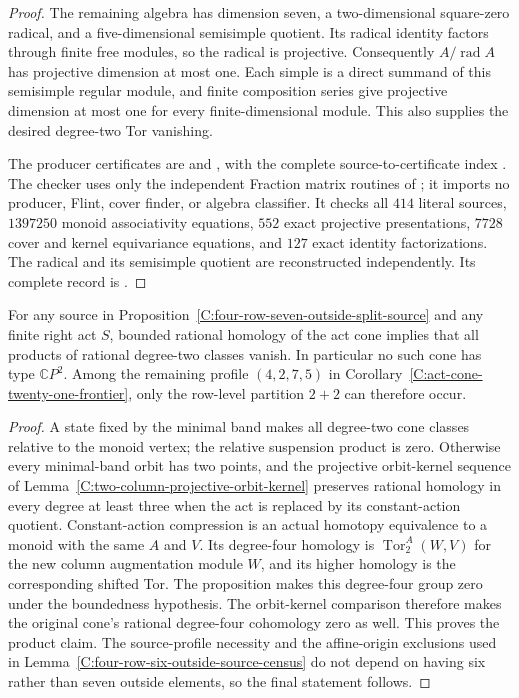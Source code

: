 \begin{proof}
The remaining algebra has dimension seven, a two-dimensional
square-zero radical, and a five-dimensional semisimple quotient.
Its radical identity factors through finite free modules, so the
radical is projective.  Consequently $A/\operatorname{rad}A$ has
projective dimension at most one.  Each simple is a direct summand
of this semisimple regular module, and finite composition series
give projective dimension at most one for every finite-dimensional
module.  This also supplies the desired degree-two Tor vanishing.

The producer certificates are
 and
, with the complete
source-to-certificate index
.
The checker  uses
only the independent Fraction matrix routines of
; it imports no
producer, Flint, cover finder, or algebra classifier.
It checks all $414$ literal sources, $1397250$ monoid associativity
equations, $552$ exact projective presentations, $7728$ cover and
kernel equivariance equations, and $127$ exact identity
factorizations.  The radical and its semisimple quotient are
reconstructed independently.  Its complete record is
.
\end{proof}

\begin{corollary}
\label{C:four-row-seven-outside-split-act-cones}
For any source in Proposition~\ref{C:four-row-seven-outside-split-source}
and any finite right act $S$, bounded rational homology of the act
cone implies that all products of rational degree-two classes vanish.
In particular no such cone has type $\mathbb CP^2$.
Among the remaining profile $(4,2,7,5)$ in
Corollary~\ref{C:act-cone-twenty-one-frontier}, only the row-level
partition $2+2$ can therefore occur.
\end{corollary}
\begin{proof}
A state fixed by the minimal band makes all degree-two cone classes
relative to the monoid vertex; the relative suspension product is
zero.  Otherwise every minimal-band orbit has two points, and the
projective orbit-kernel sequence of
Lemma~\ref{C:two-column-projective-orbit-kernel} preserves rational homology
in every degree at least three when the act is replaced by its
constant-action quotient.  Constant-action compression is an actual
homotopy equivalence to a monoid with the same $A$ and $V$.
Its degree-four homology is $\operatorname{Tor}_2^A(W,V)$ for the
new column augmentation module $W$, and its higher homology is the
corresponding shifted Tor.  The proposition makes this degree-four
group zero under the boundedness hypothesis.  The orbit-kernel
comparison therefore makes the original cone's rational
degree-four cohomology zero as well.  This proves the product claim.
The source-profile necessity and the affine-origin exclusions used
in Lemma~\ref{C:four-row-six-outside-source-census} do not depend
on having six rather than seven outside elements, so the final
statement follows.
\end{proof}

